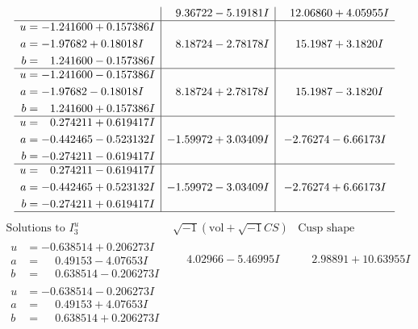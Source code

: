 \documentclass[1p]{elsarticle_modified}
\theoremstyle{definition}
\newcommand{\I}{\sqrt{-1}}
\begin{document}
$$\begin{array}{c|c|c}
 & \phantom{-}9.36722 - 5.19181 I & \phantom{-}12.06860 + 4.05955 I \\ \hline\begin{aligned}
u &= -1.241600 + 0.157386 I \\
a &= -1.97682 + 0.18018 I \\
b &= \phantom{-}1.241600 - 0.157386 I\end{aligned}
 & \phantom{-}8.18724 - 2.78178 I & \phantom{-}15.1987 + 3.1820 I \\ \hline\begin{aligned}
u &= -1.241600 - 0.157386 I \\
a &= -1.97682 - 0.18018 I \\
b &= \phantom{-}1.241600 + 0.157386 I\end{aligned}
 & \phantom{-}8.18724 + 2.78178 I & \phantom{-}15.1987 - 3.1820 I \\ \hline\begin{aligned}
u &= \phantom{-}0.274211 + 0.619417 I \\
a &= -0.442465 - 0.523132 I \\
b &= -0.274211 - 0.619417 I\end{aligned}
 & -1.59972 + 3.03409 I & -2.76274 - 6.66173 I \\ \hline\begin{aligned}
u &= \phantom{-}0.274211 - 0.619417 I \\
a &= -0.442465 + 0.523132 I \\
b &= -0.274211 + 0.619417 I\end{aligned}
 & -1.59972 - 3.03409 I & -2.76274 + 6.66173 I\\
 \hline 
 \end{array}$$\newpage$$\begin{array}{c|c|c}  
\text{Solutions to }I^u_{3}& \I (\text{vol} + \sqrt{-1}CS) & \text{Cusp shape}\\
 \hline 
\begin{aligned}
u &= -0.638514 + 0.206273 I \\
a &= \phantom{-}0.49153 - 4.07653 I \\
b &= \phantom{-}0.638514 - 0.206273 I\end{aligned}
 & \phantom{-}4.02966 - 5.46995 I & \phantom{-}2.98891 + 10.63955 I \\ \hline\begin{aligned}
u &= -0.638514 - 0.206273 I \\
a &= \phantom{-}0.49153 + 4.07653 I \\
b &= \phantom{-}0.638514 + 0.206273 I\end{aligned}

\end{array}$$
\end{document}
